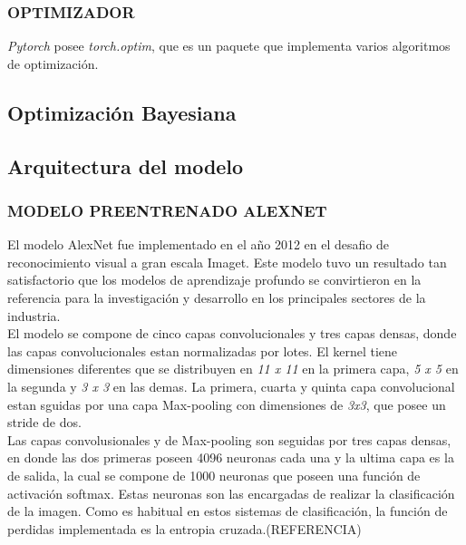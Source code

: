			
			
			
			\newpage
			\subsubsection{OPTIMIZADOR}
			
			\textit{Pytorch} posee \textit{torch.optim}, que es un paquete que implementa varios algoritmos de optimización. 
			
			
			
			
			

			
			
		\subsection{Optimización Bayesiana}	
			
			
		\subsection{Arquitectura del modelo}
			\subsubsection{\MakeUppercase{Modelo preentrenado ALEXNET}}
			
				El modelo AlexNet fue implementado en el año 2012 en el desafio de reconocimiento visual a gran escala Imaget. Este modelo tuvo un resultado tan satisfactorio que los modelos de aprendizaje profundo se convirtieron en la referencia para la investigación y desarrollo en los principales sectores de la industria. \cite{Pytorch}\\
				
				
				El modelo se compone de cinco capas convolucionales y tres capas densas, donde las capas 	convolucionales estan normalizadas por lotes. El kernel tiene dimensiones diferentes que se distribuyen en \textit{11 x 11} en la primera capa, \textit{5 x 5} en la segunda y \textit{3 x 3} en las demas. La primera, cuarta y quinta capa convolucional estan sguidas por una capa Max-pooling con dimensiones de \textit{3x3}, que posee un stride de dos.\\
				
				
				Las capas convolusionales y de Max-pooling son seguidas por tres capas densas, en donde las dos primeras poseen 4096 neuronas cada una y la ultima capa es la de salida, la cual se compone de 1000 neuronas que poseen una función de activación softmax. Estas neuronas son las encargadas de realizar la clasificación de la imagen. Como es habitual en estos sistemas de clasificación, la función de perdidas implementada es la entropia cruzada.(REFERENCIA)
				\\
				
